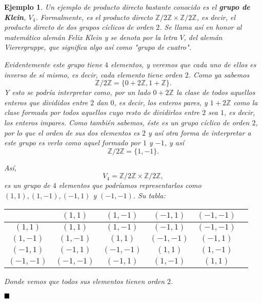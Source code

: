 \documentclass[12pt]{article}
\newtheorem{example}{Ejemplo}[theorem]
\begin{document}
\begin{example}Un ejemplo de producto directo bastante conocido es el \textbf{grupo de Klein}, $V_4$. Formalmente, es el producto directo $\mathbb{Z}/2\mathbb{Z} \times \mathbb{Z}/2\mathbb{Z}$, es decir, el producto directo de dos grupos cíclicos de orden $2$. Se llama así en honor al matemático alemán Felix Klein y se denota por la letra $V$, del alemán Vierergruppe, que significa algo así como "grupo de cuatro". 

Evidentemente este grupo tiene $4$ elementos, y veremos que cada uno de ellos es inverso de sí mismo, es decir, cada elemento tiene orden $2$. Como ya sabemos $$\mathbb{Z}/2\mathbb{Z} = \lbrace 0 + 2\mathbb{Z}, 1 + \mathbb{Z} \rbrace.$$ Y esto se podría interpretar como, por un lado $0+2\mathbb{Z}$ la clase de todos aquellos enteros que divididos entre $2$ dan $0$, es decir, los enteros pares, y $1+2\mathbb{Z}$ como la clase formada por todos aquellos cuyo resto de dividirlos entre $2$ sea $1$, es decir, los enteros impares. Como también sabemos, éste es un grupo cíclico de orden $2$, por lo que el orden de sus dos elementos es $2$ y así otra forma de interpretar a este grupo es verlo como aquel formado por $1$ y $-1$, y así $$\mathbb{Z}/2\mathbb{Z} = \lbrace 1, -1 \rbrace.$$

Así, $$V_4 = \mathbb{Z}/2\mathbb{Z} \times \mathbb{Z}/2\mathbb{Z},$$ es un grupo de $4$ elementos que podríamos representarlos como $(1,1), (1,-1), (-1,1)$ y $(-1,-1)$. Su tabla:
\begin{center}
\begin{tabular}{c|c c c c c}
&$(1,1)$&$(1,-1)$&$(-1,1)$&$(-1,-1)$&\\ \hline
$(1,1)$&$(1,1) $&$(1,-1)$&$(-1,1)$&$(-1,-1)$& \\ 
$(1,-1)$&$(1,-1)$&$(1,1)$&$(-1,-1)$&$(-1,1)$& \\ 
$(-1,1)$&$(-1,1)$&$(-1,-1)$&$(1,1)$&$(1,-1)$& \\ 
$(-1,-1)$&$(-1,-1)$&$(-1,1)$&$(1,-1)$&$(1,1)$& \\												\end{tabular}
\end{center}
Donde vemos que todos sus elementos tienen orden $2$.
\end{example}
$\hfill \blacksquare$
\end{document}
